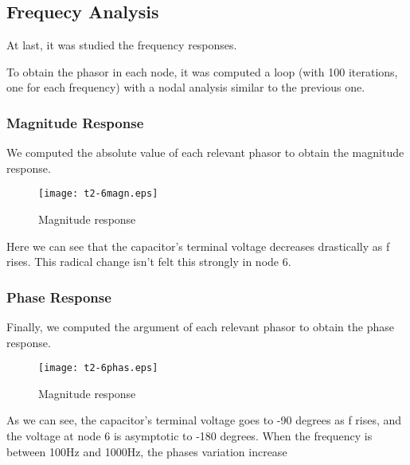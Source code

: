 \subsection{Frequecy Analysis}

At last, it was studied the frequency responses.

To obtain the phasor in each node, it was computed a loop (with 100 iterations, one for each frequency) with a nodal analysis similar to the previous one.

\subsubsection{Magnitude Response}

We computed the absolute value of each relevant phasor to obtain the magnitude response.

\begin{figure}[h] \centering
\texttt{[image: t2-6magn.eps]}
\caption{Magnitude response}\label{fig:magn}
\end{figure}

Here we can see that the capacitor's terminal voltage decreases drastically as f rises. This radical change isn't felt this strongly in node 6.


\subsubsection{Phase Response}

Finally, we computed the argument of each relevant phasor to obtain the phase response.
\begin{figure}[h] \centering
\texttt{[image: t2-6phas.eps]}
\caption{Magnitude response}\label{fig:phase}
\end{figure}

As we can see, the capacitor's terminal voltage goes to -90 degrees as f rises, and the voltage at node 6 is asymptotic to -180 degrees. When the frequency is between 100Hz and 1000Hz, the phases variation increase


